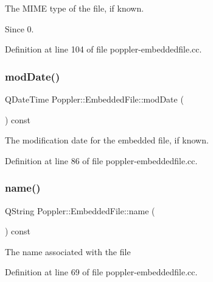The M\+I\+ME type of the file, if known.

\begin{DoxySince}{Since}
0. 
\end{DoxySince}


Definition at line 104 of file poppler-\/embeddedfile.\+cc.

\mbox{\label{class_poppler_1_1_embedded_file_aaf1bdd117d8f36a6ca83a2630bb1938f}} 
\subsubsection{\texorpdfstring{mod\+Date()}{modDate()}}
{\footnotesize\ttfamily Q\+Date\+Time Poppler\+::\+Embedded\+File\+::mod\+Date (\begin{DoxyParamCaption}{ }\end{DoxyParamCaption}) const}

The modification date for the embedded file, if known. 

Definition at line 86 of file poppler-\/embeddedfile.\+cc.

\mbox{\label{class_poppler_1_1_embedded_file_a9b1d6050fc8aed39d4b9fb3d6a16c3e4}} 
\subsubsection{\texorpdfstring{name()}{name()}}
{\footnotesize\ttfamily Q\+String Poppler\+::\+Embedded\+File\+::name (\begin{DoxyParamCaption}{ }\end{DoxyParamCaption}) const}

The name associated with the file 

Definition at line 69 of file poppler-\/embeddedfile.\+cc.

\mbox{\label{class_poppler_1_1_embedded_file_acf6adc1e33a5efbe4430893576c9b59b}} 
